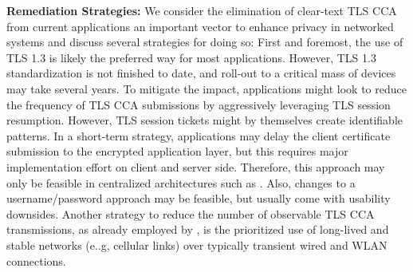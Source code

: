 \textbf{Remediation Strategies: }%
We consider the elimination of clear-text TLS CCA from current applications an important vector to enhance privacy in networked systems and discuss several strategies for doing so:
First and foremost, the use of TLS 1.3 is likely the preferred way for most applications. However, TLS 1.3 standardization is not finished to date, and roll-out to a critical mass of devices may take several years.
To mitigate the impact, applications might look to reduce the frequency of TLS CCA submissions by aggressively leveraging TLS session resumption. However, TLS session tickets might by themselves create identifiable patterns.
In a short-term strategy, applications may delay the client certificate submission to the encrypted application layer, but this requires major implementation effort on client and server side.
Therefore, this approach may only be feasible in centralized architectures such as {\apns}.
Also, changes to a username/password approach may be feasible, but usually come with usability downsides.
Another strategy to reduce the number of observable TLS CCA transmissions, as already employed by {\apns}, is the prioritized use of long-lived and stable networks (e..g, cellular links) over typically transient wired and WLAN connections.